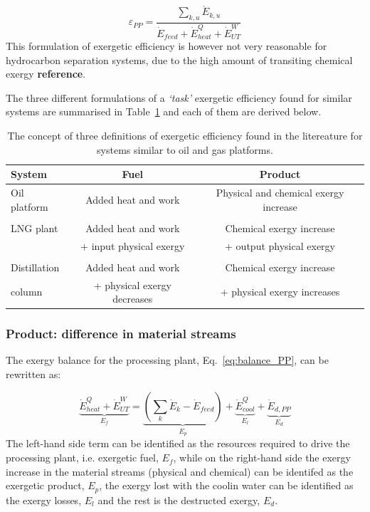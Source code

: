 \begin{equation}
	\varepsilon_{PP} = \frac{\sum_{k,u}\dot{E}_{k,u}}{\dot{E}_{feed}+\dot{E}^{Q}_{heat}+\dot{E}^{W}_{UT}}
\end{equation}
This formulation of exergetic efficiency is however not very reasonable for hydrocarbon separation systems, due to the high amount of transiting chemical exergy \textbf{reference}.


The three different formulations of a \emph{`task'} exergetic efficiency found for similar systems are summarised in Table~\ref{tab:concept_efficiencies} and each of them are derived below.

\begin{table}[hb]
\centering
\begin{tabular}{lcc}
\hline	
 System 				& Fuel 																& Product  \\
\hline
Oil platform  & Added heat and work 								& Physical and chemical exergy increase \\
\\
 LNG plant 		& Added heat and work  								& Chemical exergy increase 	\\
							& + input physical exergy 						& + output physical exergy \\
\\
 Distillation  & Added heat and work  								& Chemical exergy increase 	\\
	column				& + physical exergy decreases 				& + physical exergy increases \\
\hline
\end{tabular}
\caption{The concept of three definitions of exergetic efficiency found in the litereature for systems similar to oil and gas platforms.}
\label{tab:concept_efficiencies}
\end{table}


\subsubsection{Product: difference in material streams}
 	
The exergy balance for the processing plant, Eq.~\ref{eq:balance_PP}, can be rewritten as:

\begin{equation}
	\underbrace{\dot{E}^{Q}_{heat}+\dot{E}^{W}_{UT}}_{E_f}=\underbrace{\left(\sum_k\dot{E}_k-\dot{E}_{feed}\right)}_{E_p}+\underbrace{\dot{E}^{Q}_{cool}}_{E_l} + \underbrace{\dot{E}_{d,PP}}_{E_d}
\end{equation}
The left-hand side term can be identified as the resources required to drive the processing plant, i.e. exergetic fuel, $E_f$, while on the right-hand side the exergy increase in the material streams (physical and chemical) can be identifed as the exergetic product, $E_p$, the exergy lost with the coolin water can be identified as the exergy losses, $E_l$ and the rest is the destructed exergy, $E_d$. 

